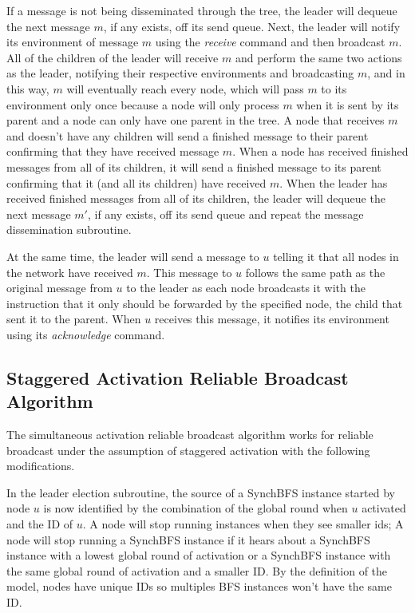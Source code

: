 \documentclass[english]{article}
\begin{document}
If a message is not being disseminated through the tree, the leader will dequeue the next message $m$, if any exists, off its send queue. Next, the leader will notify its environment of message $m$ using the \textit{receive} command and then broadcast $m$. All of the children of the leader will receive $m$ and perform the same two actions as the leader, notifying their respective environments and broadcasting $m$, and in this way, $m$ will eventually reach every node, which will pass $m$ to its environment only once because a node will only process $m$ when it is sent by its parent and a node can only have one parent in the tree. A node that receives $m$ and doesn't have any children will send a finished message to their parent confirming that they have received message $m$. When a node has received finished messages from all of its children, it will send a finished message to its parent confirming that it (and all its children) have received $m$. When the leader has received finished messages from all of its children, the leader will dequeue the next message $m'$, if any exists, off its send queue and repeat the message dissemination subroutine. 

At the same time, the leader will send a message to $u$ telling it that all nodes in the network have received $m$. This message to $u$ follows the same path as the original message from $u$ to the leader as each node broadcasts it with the instruction that it only should be forwarded by the specified node, the child that sent it to the parent. When $u$ receives this message, it notifies its environment using its \textit{acknowledge} command.


  \subsection {Staggered Activation Reliable Broadcast Algorithm}

The simultaneous activation reliable broadcast algorithm works for reliable broadcast under the assumption of staggered activation with the following modifications.

In the leader election subroutine, the source of a SynchBFS instance started by node $u$ is now identified by the combination of the global round when $u$ activated and the ID of $u$. A node will stop running instances when they see smaller ids; A node will stop running a SynchBFS instance if it hears about a SynchBFS instance with a lowest global round of activation or a SynchBFS instance with the same global round of activation and a smaller ID. By the definition of the model, nodes have unique IDs so multiples BFS instances won't have the same ID.
\end{document}
